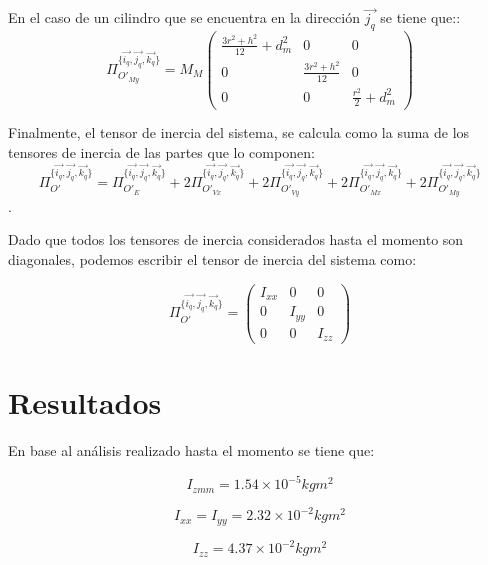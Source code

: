 En el caso de un cilindro que se encuentra en la dirección $\vec{j_q}$ se tiene que::
$$
\Pi_{O\prime_{My}}^{\{\vec{i_q}, \vec{j_q}, \vec{k_q}\}}=M_M\left(\begin{array}{ccc}
\frac{3r^2+h^2}{12} +d_m^2 &0&  0\\
0  &\frac{3r^2+h^2}{12} & 0\\
0  &0 & \frac{r^2}{2}+d_m^2  
\end{array}\right)
$$


Finalmente, el tensor de inercia del sistema, se calcula como la suma de los tensores de inercia de las partes que lo componen:
$$\Pi_{O\prime}^{\{\vec{i_q}, \vec{j_q}, \vec{k_q}\}} =\Pi_{O\prime_E}^{\{\vec{i_q}, \vec{j_q}, \vec{k_q}\}} + 2 \Pi_{O\prime_{Vx}}^{\{\vec{i_q}, \vec{j_q}, \vec{k_q}\}} + 2 \Pi_{O\prime_{Vy}}^{\{\vec{i_q}, \vec{j_q}, \vec{k_q}\}} + 2 \Pi_{O\prime_{Mx}}^{\{\vec{i_q}, \vec{j_q}, \vec{k_q}\}}+ 2 \Pi_{O\prime_{My}}^{\{\vec{i_q}, \vec{j_q}, \vec{k_q}\}}$$.

Dado que todos los tensores de inercia considerados hasta el momento son diagonales, podemos escribir el tensor de inercia del sistema como:

$$\Pi_{O\prime}^{\{\vec{i_q}, \vec{j_q}, \vec{k_q}\}}=\left(\begin{array}{ccc}
I_{xx}  &0&  0\\
0  &I_{yy}& 0\\
0  &0 & I_{zz}  
\end{array}\right)$$

\section{Resultados} 

En base al análisis realizado hasta el momento se tiene que: 

$$I_{zmm}=1.54\times10^{-5}kgm^2
$$

$$
I_{xx}=I_{yy}=2.32\times10^{-2}kgm^2
$$

$$
I_{zz}=4.37\times10^{-2}kgm^2
$$
%

